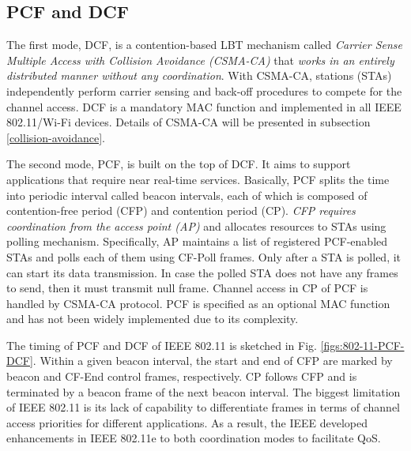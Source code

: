\subsection{PCF and DCF}
\label{pcf-dcf}
The first mode, DCF, is a contention-based LBT mechanism called \textit{Carrier Sense Multiple Access with Collision Avoidance (CSMA-CA)} that \textit{works in an entirely distributed manner without any coordination}. With CSMA-CA, stations (STAs) independently perform carrier sensing and back-off procedures to compete for the channel access. DCF is a mandatory MAC function and implemented in all IEEE 802.11/Wi-Fi devices. Details of CSMA-CA will be presented in subsection \ref{collision-avoidance}.

The second mode, PCF, is built on the top of DCF. It aims to support applications that require near real-time services. Basically, PCF splits the time into periodic interval called beacon intervals, each of which is composed of contention-free period (CFP) and contention period (CP). \textit{CFP requires coordination from the access point (AP)} and allocates resources to STAs using polling mechanism. Specifically, AP maintains a list of registered PCF-enabled STAs and polls each of them using CF-Poll frames. Only after a STA is polled, it can start its data transmission. In case the polled STA does not have any frames to send, then it must transmit null frame. Channel access in CP of PCF is handled by CSMA-CA protocol. PCF is specified as an optional MAC function and has not been widely implemented due to its complexity.

The timing of PCF and DCF of IEEE 802.11 is sketched in Fig. \ref{figs:802-11-PCF-DCF}. Within a given beacon interval, the start and end of CFP are marked by beacon and CF-End control frames, respectively. CP follows CFP and is terminated by a beacon frame of the next beacon interval. The biggest limitation of IEEE 802.11 is its lack of capability to differentiate frames in terms of channel access priorities for different applications. As a result, the IEEE developed enhancements in IEEE 802.11e to both coordination modes to facilitate QoS.

